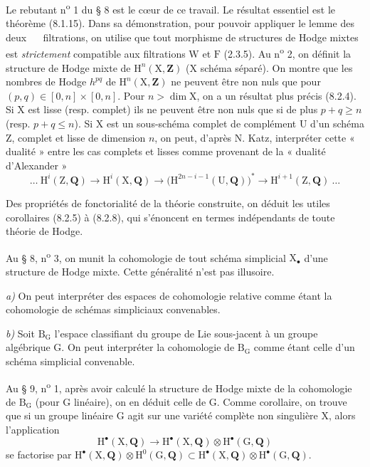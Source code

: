 \documentclass[11pt,leqno]{article}
\newcommand{\Page}[1]{\ifvmode\noindent\else\unskip\ \fi{\footnotesize\textcolor{gray}{[p.\,#1]}}\ \ignorespaces}
\begin{document}
Le rebutant n\textsuperscript{o} 1 du § 8 est le cœur de ce travail. Le résultat essentiel est le théorème (8.1.15). Dans sa démonstration, pour pouvoir appliquer le lemme des deux
\Page{7}
filtrations, on utilise que tout morphisme de structures de Hodge mixtes est \textit{strictement} compatible aux filtrations \(\mathrm{W}\) et \(\mathrm{F}\) (2.3.5). Au n\textsuperscript{o} 2, on définit la structure de Hodge mixte de \(\mathrm{H}^n(\mathrm{X},\mathbf{Z})\) (\(\mathrm{X}\) schéma séparé). On montre que les nombres de Hodge \(h^{pq}\) de \(\mathrm{H}^n(\mathrm{X},\mathbf{Z})\) ne peuvent être non nuls que pour \((p,q)\in[0,n]\times[0,n]\). Pour \(n>\dim\mathrm{X}\), on a un résultat plus précis (8.2.4). Si \(\mathrm{X}\) est lisse (resp. complet) ils ne peuvent être non nuls que si de plus \(p+q\geq n\) (resp. \(p+q\leq n\)). Si \(\mathrm{X}\) est un sous-schéma complet de complément \(\mathrm{U}\) d’un schéma \(\mathrm{Z}\), complet et lisse de dimension \(n\), on peut, d’après N. Katz, interpréter cette « dualité » entre les cas complets et lisses comme provenant de la « dualité d’Alexander »
\[
\ldots\ \mathrm{H}^i(\mathrm{Z},\mathbf{Q})
\to \mathrm{H}^i(\mathrm{X},\mathbf{Q})
\to \bigl(\mathrm{H}^{2n-i-1}(\mathrm{U},\mathbf{Q})\bigr)^*
\to \mathrm{H}^{i+1}(\mathrm{Z},\mathbf{Q})\ \ldots
\]

Des propriétés de fonctorialité de la théorie construite, on déduit les utiles corollaires (8.2.5) à (8.2.8), qui s’énoncent en termes indépendants de toute théorie de Hodge.

Au § 8, n\textsuperscript{o} 3, on munit la cohomologie de tout schéma simplicial \(\mathrm{X}_{\bullet}\) d’une structure de Hodge mixte. Cette généralité n’est pas illusoire.

\textit{a)} On peut interpréter des espaces de cohomologie relative comme étant la cohomologie de schémas simpliciaux convenables.

\textit{b)} Soit \(\mathrm{B}_{\mathrm{G}}\) l’espace classifiant du groupe de Lie sous-jacent à un groupe algébrique \(\mathrm{G}\). On peut interpréter la cohomologie de \(\mathrm{B}_{\mathrm{G}}\) comme étant celle d’un schéma simplicial convenable.

Au § 9, n\textsuperscript{o} 1, après avoir calculé la structure de Hodge mixte de la cohomologie de \(\mathrm{B}_{\mathrm{G}}\) (pour \(\mathrm{G}\) linéaire), on en déduit celle de \(\mathrm{G}\). Comme corollaire, on trouve que si un groupe linéaire \(\mathrm{G}\) agit sur une variété complète non singulière \(\mathrm{X}\), alors l’application
\[
\mathrm{H}^{\bullet}(\mathrm{X},\mathbf{Q})
\to \mathrm{H}^{\bullet}(\mathrm{X},\mathbf{Q})
\otimes \mathrm{H}^{\bullet}(\mathrm{G},\mathbf{Q})
\]
se factorise par \(\mathrm{H}^{\bullet}(\mathrm{X},\mathbf{Q})\otimes\mathrm{H}^{0}(\mathrm{G},\mathbf{Q})\subset\mathrm{H}^{\bullet}(\mathrm{X},\mathbf{Q})\otimes\mathrm{H}^{\bullet}(\mathrm{G},\mathbf{Q})\).
\end{document}
